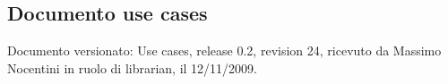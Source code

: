 \subsection{Documento use cases}
Documento versionato: Use cases, release 0.2, revision 24, ricevuto da
Massimo Nocentini in ruolo di librarian, il 12/11/2009.